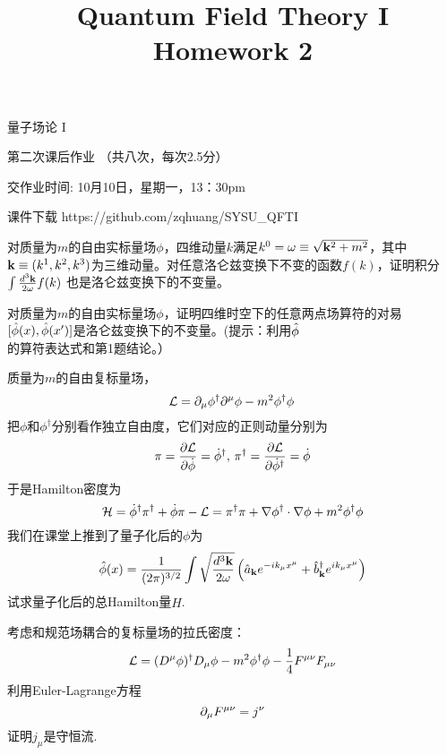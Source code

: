 \documentclass[CJK]{beamer}
\title{Quantum Field Theory I \\ Homework 2}
\author{}
\date{}
\begin{document}
\begin{frame}
 
\begin{center}
\begin{Large}
\bch
量子场论 I 

{\vskip 0.3in}

第二次课后作业 （共八次，每次2.5分）

交作业时间: 10月10日，星期一，13：30pm

\ech
\end{Large}
\end{center}

\vskip 0.2in

\bch
课件下载
\ech
https://github.com/zqhuang/SYSU\_QFTI

\end{frame}

\begin{frame}
\bch
对质量为$m$的自由实标量场$\phi$，四维动量$k$满足$k^0 = \omega \equiv \sqrt{{\mathbf{k}}^2+m^2}$，其中${\mathbf{k}}\equiv (k^1, k^2, k^3)$为三维动量。对任意洛仑兹变换下不变的函数$f(k)$，证明积分$\int \frac{d^3{\mathbf{k}}}{2\omega} f(k)$ 也是洛仑兹变换下的不变量。
\ech
\end{frame}

\begin{frame}
\bch
对质量为$m$的自由实标量场$\phi$，证明四维时空下的任意两点场算符的对易$[{\hat{\phi}}(x),{\hat{\phi}}(x')]$是洛仑兹变换下的不变量。(提示：利用${\hat{\phi}}$的算符表达式和第1题结论。）
\ech
\end{frame}

\begin{frame}
\bch
质量为$m$的自由复标量场，
$${\mathcal{L}} = \partial_\mu\phi^\dagger \partial^\mu \phi - m^2\phi^\dagger\phi\, $$
把$\phi$和$\phi^\dagger$分别看作独立自由度，它们对应的正则动量分别为
$$\pi = \frac{\partial {\mathcal{L}}}{\partial \dot\phi} = \dot\phi^\dagger, \,\pi^\dagger = \frac{\partial {\mathcal{L}}}{\partial \dot\phi^\dagger} = \dot\phi $$
于是Hamilton密度为
$${\mathcal{H}} = \dot\phi^\dagger \pi^\dagger +\dot\phi \pi - {\mathcal{L}} = \pi^\dagger \pi + \nabla\phi^\dagger \cdot\nabla\phi + m^2\phi^\dagger \phi $$
我们在课堂上推到了量子化后的$\phi$为
$${\hat{\phi}}(x) = \frac{1}{(2\pi)^{3/2}} \int \sqrt{\frac{d^3{\mathbf{k}}}{2\omega}} \left({\hat{a}}_{{\mathbf{k}}} e^{-ik_\mu x^\mu} + {\hat{b}^\dagger}_{{\mathbf{k}}}e^{ik_\mu x^\mu}\right) $$
试求量子化后的总Hamilton量$\hat{H}$.
\ech
\end{frame}


\begin{frame}
\bch
考虑和规范场耦合的复标量场的拉氏密度：
$${\mathcal{L}} = (D^\mu\phi)^\dagger D_\mu \phi - m^2\phi^\dagger \phi  - \frac{1}{4}{F^{\mu\nu}}{F_{\mu\nu}}$$
利用Euler-Lagrange方程
$$\partial_\mu {F^{\mu\nu}} = j^\nu$$
证明$j_\mu$是守恒流.
\ech
\end{frame}
\end{document}
